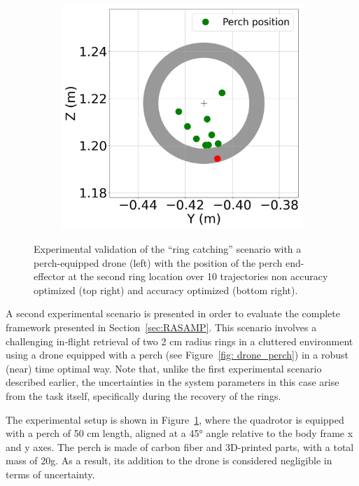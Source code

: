 \begin{figure} [htp]
\begin{subfigure}{0.37\linewidth}
        \includegraphics[width=\linewidth]{figures/robust_accurate/Exp_ring_opti_full_zoom.png}
    \end{subfigure}\hfill
    
\caption{Experimental validation of the ``ring catching'' scenario with a perch-equipped drone (left) with the position of the perch end-effector at the second ring location over 10 trajectories non accuracy optimized (top right) and accuracy optimized (bottom right).}
\label{fig: exp ring}
\end{figure}

A second experimental scenario is presented in order to evaluate the complete framework presented in Section~\ref{sec:RASAMP}.
This scenario involves a challenging in-flight retrieval of two 2 cm radius rings in a cluttered environment using a drone equipped with a perch (see Figure~\ref{fig: drone_perch}) in a robust (near) time optimal way.
Note that, unlike the first experimental scenario described earlier, the uncertainties in the system parameters in this case arise from the task itself, specifically during the recovery of the rings.

The experimental setup is shown in Figure~\ref{fig: exp ring}, where the quadrotor is equipped with a perch of 50 cm length, aligned at a 45° angle relative to the body frame x and y axes.
The perch is made of carbon fiber and 3D-printed parts, with a total mass of 20g. 
As a result, its addition to the drone is considered negligible in terms of uncertainty.

